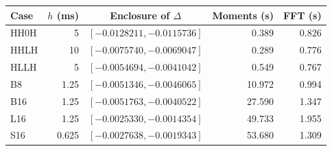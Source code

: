 \begin{tabular}{lrcrr}\toprule
Case & $h$ (ms) & Enclosure of $\Delta$ & Moments (s) & FFT (s)\\\midrule
HH0H & 5 & $[-0.0128211, -0.0115736]$ & 0.389 & 0.826 \\
HHLH & 10 & $[-0.0075740, -0.0069047]$ & 0.289 & 0.776 \\
HLLH & 5 & $[-0.0054694, -0.0041042]$ & 0.549 & 0.767 \\
B8 & 1.25 & $[-0.0051346, -0.0046065]$ & 10.972 & 0.994 \\
B16 & 1.25 & $[-0.0051763, -0.0040522]$ & 27.590 & 1.347 \\
L16 & 1.25 & $[-0.0025330, -0.0014354]$ & 49.733 & 1.955 \\
S16 & 0.625 & $[-0.0027638, -0.0019343]$ & 53.680 & 1.309 \\
\bottomrule\end{tabular}
